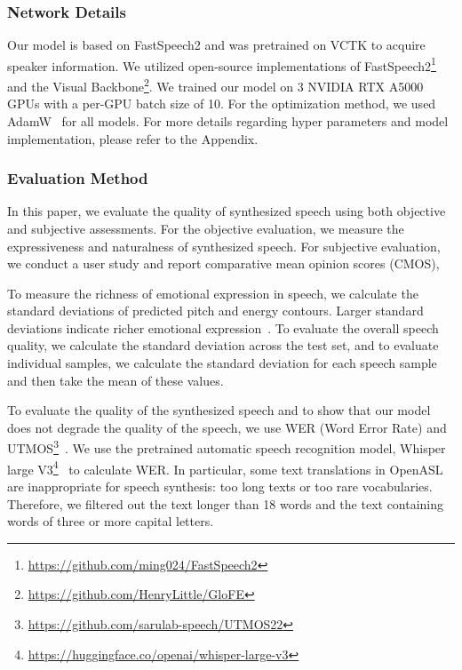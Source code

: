 \vspace{-2mm}
\subsubsection{Network Details}
Our model is based on FastSpeech2 and was pretrained on VCTK to acquire speaker information. We utilized open-source implementations of FastSpeech2\footnote{\url{https://github.com/ming024/FastSpeech2}} and the Visual Backbone\footnote{\url{https://github.com/HenryLittle/GloFE}}.
We trained our model on 3 NVIDIA RTX A5000 GPUs with a per-GPU batch size of 10.
For the optimization method, we used AdamW~\cite{loshchilov2018decoupled} for all models. For more details regarding hyper parameters and model implementation, please refer to the Appendix.

\vspace{-2mm}
\subsubsection{Evaluation Method}
In this paper, we evaluate the quality of synthesized speech using both objective and subjective assessments.
For the objective evaluation, 
we measure the expressiveness and naturalness of synthesized speech. 
For subjective evaluation, 
we conduct a user study and report comparative mean opinion scores (CMOS),

To measure the richness of emotional expression in speech,
we calculate the standard deviations of predicted pitch and energy contours. 
Larger standard deviations indicate richer emotional expression~\cite{kharitonov-etal-2022-text}.
To evaluate the overall speech quality, 
we calculate the standard deviation across the test set, 
and to evaluate individual samples, 
we calculate the standard deviation for each speech sample and then take the mean of these values.

To evaluate the quality of the synthesized speech and to show that our model does not degrade the quality of the speech, 
we use WER (Word Error Rate) and UTMOS\footnote{\url{https://github.com/sarulab-speech/UTMOS22}}~\cite{saeki22c_interspeech}. 
We use the pretrained automatic speech recognition model, 
Whisper large V3\footnote{\url{https://huggingface.co/openai/whisper-large-v3}}~\cite{radford2022whisper} to calculate WER. 
In particular, some text translations in OpenASL are inappropriate for speech synthesis: too long texts or too rare vocabularies. 
Therefore, we filtered out the text longer than 18 words and the text containing words of three or more capital letters.

